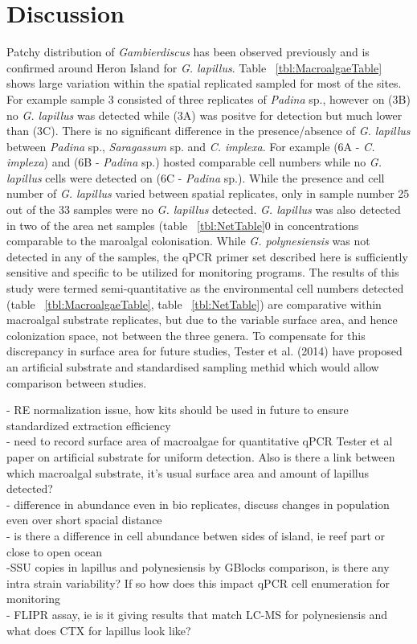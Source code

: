 \documentclass[12pt]{article}
\begin{document}
\section{Discussion}

Patchy distribution of \emph{Gambierdiscus} has been observed previously and is confirmed around Heron Island for \emph{G. lapillus}. Table ~\ref{tbl:MacroalgaeTable} shows large variation within the spatial replicated sampled for most of the sites. For example sample 3 consisted of three replicates of \emph{Padina} sp., however on (3B) no \emph{G. lapillus} was detected while (3A) was positve for detection but much lower than (3C).
There is no significant difference in the presence/absence of \emph{G. lapillus} between \emph{Padina} sp., \emph{Saragassum} sp. and \emph{C. implexa}. For example (6A - \emph{C. implexa}) and (6B - \emph{Padina} sp.) hosted comparable cell numbers while no \emph{G. lapillus} cells were detected on (6C - \emph{Padina} sp.). While the presence and cell number of \emph{G. lapillus} varied between spatial replicates, only in sample number 25 out of the 33 samples were no \emph{G. lapillus} detected. \emph{G. lapillus} was also detected in two of the area net samples (table ~\ref{tbl:NetTable}0 in concentrations comparable to the maroalgal colonisation.
While \emph{G. polynesiensis} was not detected in any of the samples, the qPCR primer set described here is sufficiently sensitive and specific to be utilized for monitoring programs.
The results of this study were termed semi-quantitative as the environmental cell numbers detected (table ~\ref{tbl:MacroalgaeTable}, table ~\ref{tbl:NetTable}) are comparative within macroalgal substrate replicates, but due to the variable surface area, and hence colonization space, not between the three genera. To compensate for this discrepancy in surface area for future studies, Tester et al. (2014) have proposed an artificial substrate and standardised sampling methid which would allow comparison between studies.


- RE normalization issue, how kits should be used in future to ensure standardized extraction efficiency\\
- need to record surface area of macroalgae for quantitative qPCR Tester et al paper on artificial substrate for uniform detection. Also is there a link between which macroalgal substrate, it's usual surface area and amount of lapillus detected?\\
- difference in abundance even in bio replicates, discuss changes in population even over short spacial distance\\
- is there a difference in cell abundance betwen sides of island, ie reef part or close to open ocean\\
-SSU copies in lapillus and polynesiensis by GBlocks comparison, is there any intra strain variability? If so how does this impact qPCR cell enumeration for monitoring\\
- FLIPR assay, ie is it giving results that match LC-MS for polynesiensis and what does CTX for lapillus look like?
\newpage
\end{document}
